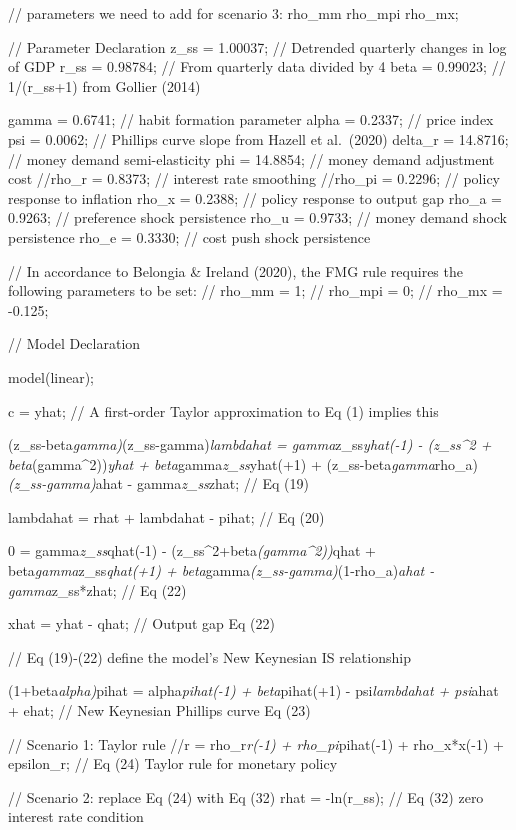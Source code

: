 \documentclass[11pt,preprint, authoryear]{elsarticle}
\numberwithin{equation}{section}
\numberwithin{figure}{section}
\numberwithin{table}{section}
\begin{document}
// parameters we need to add for scenario 3: rho\_mm rho\_mpi rho\_mx;

// Parameter Declaration z\_ss = 1.00037; // Detrended quarterly changes
in log of GDP r\_ss = 0.98784; // From quarterly data divided by 4 beta
= 0.99023; // 1/(r\_ss+1) from Gollier (2014)

gamma = 0.6741; // habit formation parameter alpha = 0.2337; // price
index psi = 0.0062; // Phillips curve slope from Hazell et al.~(2020)
delta\_r = 14.8716; // money demand semi-elasticity phi = 14.8854; //
money demand adjustment cost //rho\_r = 0.8373; // interest rate
smoothing //rho\_pi = 0.2296; // policy response to inflation rho\_x =
0.2388; // policy response to output gap rho\_a = 0.9263; // preference
shock persistence rho\_u = 0.9733; // money demand shock persistence
rho\_e = 0.3330; // cost push shock persistence

// In accordance to Belongia \& Ireland (2020), the FMG rule requires
the following parameters to be set: // rho\_mm = 1; // rho\_mpi = 0; //
rho\_mx = -0.125;

// Model Declaration

model(linear);

c = yhat; // A first-order Taylor approximation to Eq (1) implies this

(z\_ss-beta\emph{gamma)}(z\_ss-gamma)\emph{lambdahat =
gamma}z\_ss\emph{yhat(-1) - (z\_ss\^{}2 + beta}(gamma\^{}2))\emph{yhat +
beta}gamma\emph{z\_ss}yhat(+1) +
(z\_ss-beta\emph{gamma}rho\_a)\emph{(z\_ss-gamma)}ahat -
gamma\emph{z\_ss}zhat; // Eq (19)

lambdahat = rhat + lambdahat - pihat; // Eq (20)

0 = gamma\emph{z\_ss}qhat(-1) - (z\_ss\^{}2+beta\emph{(gamma\^{}2))}qhat
+ beta\emph{gamma}z\_ss\emph{qhat(+1) +
beta}gamma\emph{(z\_ss-gamma)}(1-rho\_a)\emph{ahat - gamma}z\_ss*zhat;
// Eq (22)

xhat = yhat - qhat; // Output gap Eq (22)

// Eq (19)-(22) define the model's New Keynesian IS relationship

(1+beta\emph{alpha)}pihat = alpha\emph{pihat(-1) + beta}pihat(+1) -
psi\emph{lambdahat + psi}ahat + ehat; // New Keynesian Phillips curve Eq
(23)

// Scenario 1: Taylor rule //r = rho\_r\emph{r(-1) + rho\_pi}pihat(-1) +
rho\_x*x(-1) + epsilon\_r; // Eq (24) Taylor rule for monetary policy

// Scenario 2: replace Eq (24) with Eq (32) rhat = -ln(r\_ss); // Eq
(32) zero interest rate condition
\end{document}
